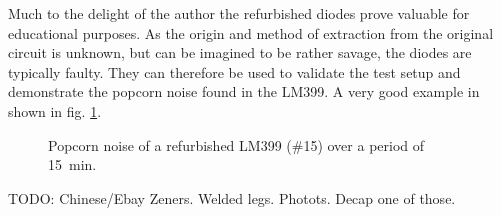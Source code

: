 Much to the delight of the author the refurbished diodes prove valuable for educational purposes. As the origin and method of extraction from the original circuit is unknown, but can be imagined to be rather savage, the diodes are typically faulty. They can therefore be used to validate the test setup and demonstrate the popcorn noise found in the LM399. A very good example in shown in fig. \ref{fig:fake_lm399_popcorn_noise}.

\begin{figure}[h]
    \centering
    
    \caption{Popcorn noise of a refurbished LM399 (\#15) over a period of \qty{15}{\minute}.}
    \label{fig:fake_lm399_popcorn_noise}
\end{figure}

TODO: Chinese/Ebay Zeners. Welded legs. Photots. Decap one of those.



